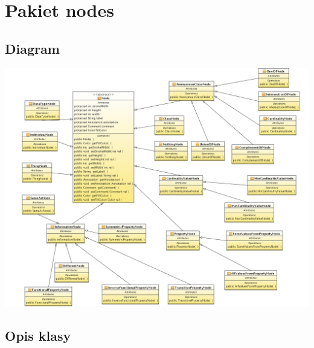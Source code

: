 \documentclass[a4paper,10pt]{article}
\begin{document}
\section{Pakiet nodes}

\subsection{Diagram}

 \includegraphics[width=\linewidth]{./modelowanie/OV_UML/NodesClassDiagram.png}

\subsection{Opis klasy}
\end{document}
